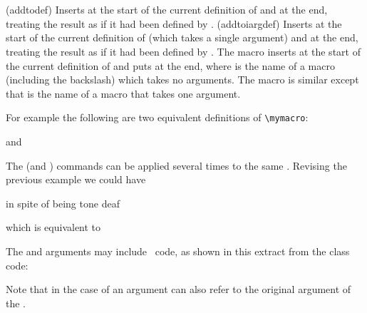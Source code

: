 \begin{syntax}
\cmd{\addtodef} \\
\cmd{\addtoiargdef} \\
\end{syntax}
\glossary(addtodef)%
  {}%
  {Inserts  at the start of the current definition of 
    and  at the end, treating the result
   as if it had been defined by .}
\glossary(addtoiargdef)%
  {}%
  {Inserts  at the start of the current definition of 
    (which takes a single argument) and  at the 
    end, treating the result as if it had been defined by .}
The macro \cmd{\addtodef} inserts  at the start of the
current definition of  and puts  at the end,
where  is the name of a macro (including the backslash) which 
takes no arguments. The \cmd{\addtoiargdef} macro is similar except that
 is the name of a macro that takes one argument.

 For example the following are two equivalent
definitions of \verb?\mymacro?:
\begin{lcode}
\newcommand{\mymacro}[1]{#1 is a violinist in spite of being tone deaf}
\end{lcode}
and
\begin{lcode}
\newcommand{\mymacro}[1]{#1 is a violinist}
\end{lcode}

    The \cmd{\addtoiargdef} (and \cmd{\addtodef}) commands
can be applied several times to the same . Revising the
previous example we could have
\begin{lcode}
\newcommand{\mymacro}[1]{#1 is a violinist}
%
                       { in spite of being tone deaf}
\end{lcode}
which is equivalent to
\begin{lcode}
\newcommand{\mymacro}[1]{%
  Although somewhat elderly, #1 is a violinist
  in spite of being tone deaf and a bagpiper}
\end{lcode}

The  and  arguments may include \ltx\ code, 
as shown in this extract from the class code:
\begin{lcode}
\end{lcode}
Note that in the case of \cmd{\addtoiargdef} an argument can also refer
to the original argument of the .

